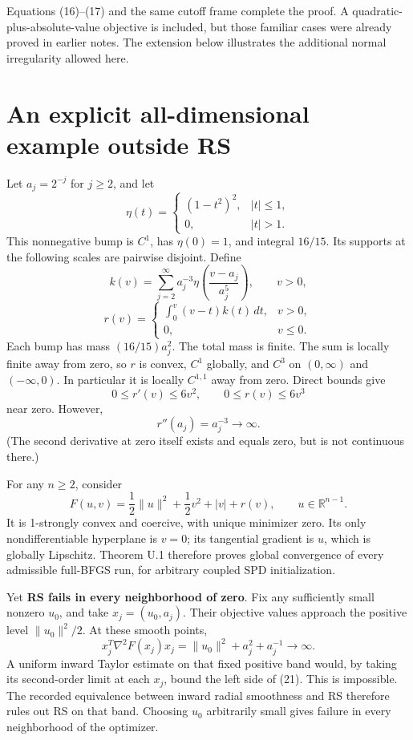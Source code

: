 \documentclass[10pt,oneside,openany]{book}
\theoremstyle{remark}\newtheorem{remark}{Remark}[chapter]
\begin{document}
Equations (16)--(17) and the same cutoff frame complete the proof. A
quadratic-plus-absolute-value objective is included, but those familiar
cases were already proved in earlier notes. The extension below
illustrates the additional normal irregularity allowed here.


\setcounter{section}{6}
\setcounter{theorem}{0}
\setcounter{lemma}{0}
\setcounter{corollary}{0}
\setcounter{proposition}{0}
\setcounter{remark}{0}
\setcounter{equation}{0}
\section{An explicit all-dimensional example outside
RS}\label{U:an-explicit-all-dimensional-example-outside-rs}

Let \(a_j=2^{-j}\) for \(j\ge2\), and let \[
 \eta(t)=\begin{cases}(1-t^2)^2,&|t|\le1,\\0,&|t|>1.\end{cases}
\] This nonnegative bump is \(C^1\), has \(\eta(0)=1\), and integral
\(16/15\). Its supports at the following scales are pairwise disjoint.
Define \[
 k(v)=\sum_{j=2}^{\infty}a_j^{-3}
 \eta\!\left(\frac{v-a_j}{a_j^5}\right),\qquad v>0,
\] \[
 r(v)=\begin{cases}
 \displaystyle\int_0^v(v-t)k(t)\,dt,&v>0,\\
 0,&v\le0.
 \end{cases}\tag{U.18}
\] Each bump has mass \((16/15)a_j^2\). The total mass is finite. The
sum is locally finite away from zero, so \(r\) is convex, \(C^1\)
globally, and \(C^3\) on \((0,\infty)\) and \((-\infty,0)\). In
particular it is locally \(C^{1,1}\) away from zero. Direct bounds give
\[
 0\le r'(v)\le6v^2,\qquad 0\le r(v)\le6v^3
\] near zero. However, \[
 r''(a_j)=a_j^{-3}\to\infty.\tag{U.19}
\] (The second derivative at zero itself exists and equals zero, but is
not continuous there.)

For any \(n\ge2\), consider \[
 \boxed{
 F(u,v)=\frac12\|u\|^2+\frac12v^2+|v|+r(v),
 \qquad u\in\mathbb R^{n-1}.
 }\tag{U.20}
\] It is 1-strongly convex and coercive, with unique minimizer zero. Its
only nondifferentiable hyperplane is \(v=0\); its tangential gradient is
\(u\), which is globally Lipschitz. Theorem U.1 therefore proves global
convergence of every admissible full-BFGS run, for arbitrary coupled SPD
initialization.

Yet \textbf{RS fails in every neighborhood of zero}. Fix any
sufficiently small nonzero \(u_0\), and take \(x_j=(u_0,a_j)\). Their
objective values approach the positive level \(\|u_0\|^2/2\). At these
smooth points, \[
 x_j^T\nabla^2F(x_j)x_j
 =\|u_0\|^2+a_j^2+a_j^{-1}\longrightarrow\infty.\tag{U.21}
\] A uniform inward Taylor estimate on that fixed positive band would,
by taking its second-order limit at each \(x_j\), bound the left side of
(21). This is impossible. The recorded equivalence between inward radial
smoothness and RS therefore rules out RS on that band. Choosing \(u_0\)
arbitrarily small gives failure in every neighborhood of the optimizer.
\end{document}
